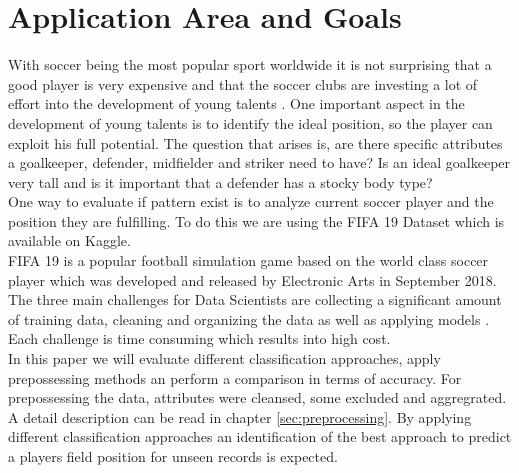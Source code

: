 \section{Application Area and Goals}
With soccer being the most popular sport worldwide it is not surprising that a good player is very expensive and that the soccer clubs are investing a lot of effort into the development of young talents \cite{ref_Transfermarkt}. One important aspect in the development of young talents is to identify the ideal position, so the player can exploit his full potential.
The question that arises is, are there specific attributes a goalkeeper, defender, midfielder and striker need to have? Is an ideal goalkeeper very tall and is it important that a defender has a stocky body type?\\
One way to evaluate if pattern exist is to analyze current soccer player and the position they are fulfilling. To do this we are using the FIFA 19 Dataset which is available on Kaggle.\\
FIFA 19 is a popular football simulation game based on the world class soccer player which was developed and released by Electronic Arts in September 2018. 
The three main challenges for Data Scientists are collecting a significant amount of training data, cleaning and organizing the data as well as applying models  \cite{ref_Crowdflower}. Each challenge is time consuming which results into high cost.\\
In this paper we will evaluate different classification approaches, apply prepossessing methods an perform a comparison in terms of accuracy. For prepossessing the data, attributes were cleansed, some excluded and aggregrated. A detail description can be read in chapter \ref{sec:preprocessing}.
By applying different classification approaches an identification of the best approach to predict a players field position for unseen records is expected.


